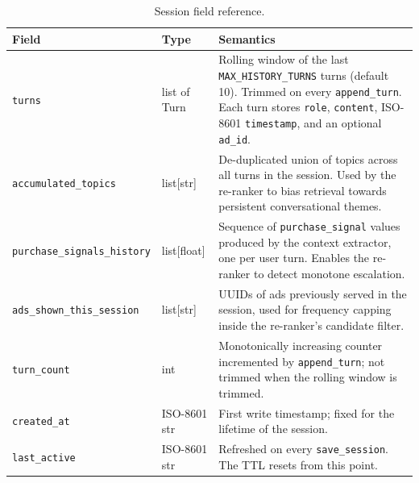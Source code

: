 \begin{appendices}
\begin{table}[H]
    \centering
    \caption{Session field reference.}
    \label{tab:session-fields}
    \footnotesize
    \begin{tabular}{@{}lp{3.3cm}p{7.5cm}@{}}
        \toprule
        \textbf{Field} & \textbf{Type} & \textbf{Semantics} \\ \midrule
        \texttt{turns}                    & list of Turn      & Rolling window of the last \texttt{MAX\_HISTORY\_TURNS} turns (default 10). Trimmed on every \texttt{append\_turn}. Each turn stores \texttt{role}, \texttt{content}, ISO-8601 \texttt{timestamp}, and an optional \texttt{ad\_id}. \\
        \texttt{accumulated\_topics}      & list[str]         & De-duplicated union of topics across all turns in the session. Used by the re-ranker to bias retrieval towards persistent conversational themes.                                                                                 \\
        \texttt{purchase\_signals\_history} & list[float]     & Sequence of \texttt{purchase\_signal} values produced by the context extractor, one per user turn. Enables the re-ranker to detect monotone escalation.                                                                          \\
        \texttt{ads\_shown\_this\_session}& list[str]         & UUIDs of ads previously served in the session, used for frequency capping inside the re-ranker's candidate filter.                                                                                                               \\
        \texttt{turn\_count}              & int               & Monotonically increasing counter incremented by \texttt{append\_turn}; not trimmed when the rolling window is trimmed.                                                                                                            \\
        \texttt{created\_at}              & ISO-8601 str      & First write timestamp; fixed for the lifetime of the session.                                                                                                                                                                    \\
        \texttt{last\_active}             & ISO-8601 str      & Refreshed on every \texttt{save\_session}. The TTL resets from this point.                                                                                                                                                        \\
        \bottomrule
    \end{tabular}
\end{table}


\end{appendices}
